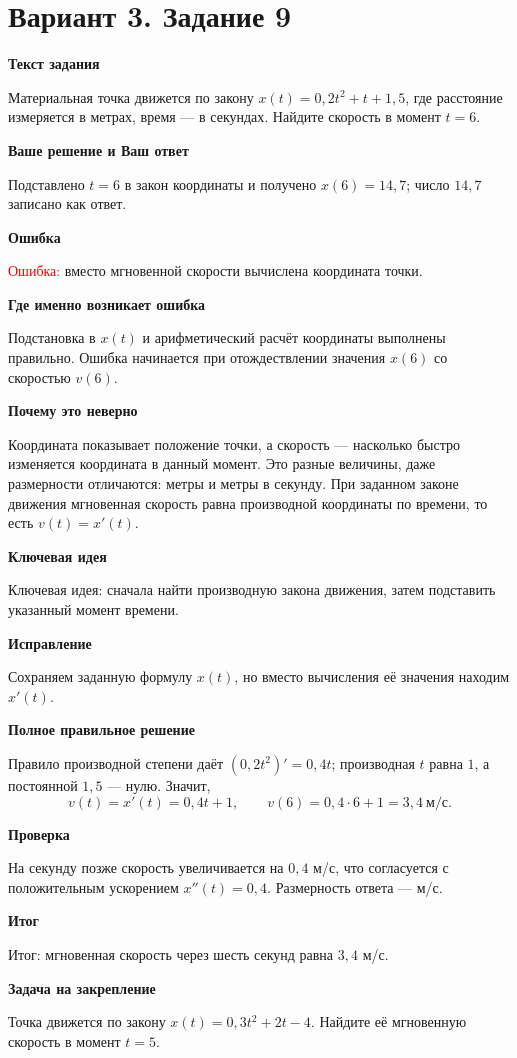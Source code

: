 \documentclass[11pt,a4paper]{article}
\newcommand{\Part}[1]{\par\medskip\noindent\textbf{#1}\par\smallskip}
\newcommand{\Task}[2]{\clearpage\phantomsection\label{task:#1}\section*{#2}}
\newcommand{\Err}[1]{\textcolor{red}{Ошибка:} #1}
\newcommand{\Idea}[1]{\textcolor{blue!60!black}{Ключевая идея:} #1}
\newcommand{\Result}[1]{\textcolor{teal!60!black}{Итог:} #1}
\begin{document}
\Task{v39}{Вариант 3. Задание 9}
\Part{Текст задания}
Материальная точка движется по закону $x(t)=0{,}2t^2+t+1{,}5$, где расстояние измеряется в метрах, время --- в секундах. Найдите скорость в момент $t=6$.
\Part{Ваше решение и Ваш ответ}
Подставлено $t=6$ в закон координаты и получено $x(6)=14{,}7$; число $14{,}7$ записано как ответ.
\Part{Ошибка}
\Err{вместо мгновенной скорости вычислена координата точки.}
\Part{Где именно возникает ошибка}
Подстановка в $x(t)$ и арифметический расчёт координаты выполнены правильно. Ошибка начинается при отождествлении значения $x(6)$ со скоростью $v(6)$.
\Part{Почему это неверно}
Координата показывает положение точки, а скорость --- насколько быстро изменяется координата в данный момент. Это разные величины, даже размерности отличаются: метры и метры в секунду. При заданном законе движения мгновенная скорость равна производной координаты по времени, то есть $v(t)=x'(t)$.
\Part{Ключевая идея}
\Idea{сначала найти производную закона движения, затем подставить указанный момент времени.}
\Part{Исправление}
Сохраняем заданную формулу $x(t)$, но вместо вычисления её значения находим $x'(t)$.
\Part{Полное правильное решение}
Правило производной степени даёт $(0{,}2t^2)'=0{,}4t$; производная $t$ равна $1$, а постоянной $1{,}5$ --- нулю. Значит,
\[v(t)=x'(t)=0{,}4t+1,\qquad v(6)=0{,}4\cdot6+1=3{,}4\ \text{м/с}.\]
\Part{Проверка}
На секунду позже скорость увеличивается на $0{,}4$ м/с, что согласуется с положительным ускорением $x''(t)=0{,}4$. Размерность ответа --- м/с.
\Part{Итог}
\Result{мгновенная скорость через шесть секунд равна $3{,}4$ м/с.}
\Part{Задача на закрепление}
Точка движется по закону $x(t)=0{,}3t^2+2t-4$. Найдите её мгновенную скорость в момент $t=5$.
\end{document}

